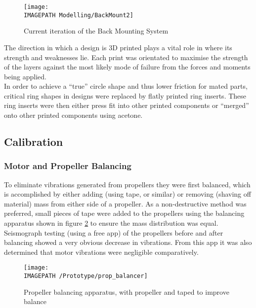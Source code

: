 \begin{figure}[!ht]
	\centering
	\texttt{[image: \\IMAGEPATH Modelling/BackMount2]}
	\caption{Current iteration of the Back Mounting System}
	\label{fig:designbackmount}
\end{figure}
		
The direction in which a design is 3D printed plays a vital role in where its strength and weaknesses lie. Each print was orientated to maximise the strength of the layers against the most likely mode of failure from the forces and moments being applied.\\
In order to achieve a ``true'' circle shape and thus lower friction for mated parts, critical ring shapes in designs were replaced by flatly printed ring inserts. These ring inserts were then either press fit into other printed components or ``merged'' onto other printed components using acetone. 


\subsection{Calibration}
\subsubsection*{Motor and Propeller Balancing}
To eliminate vibrations generated from propellers they were first balanced, which is accomplished by either adding (using tape, or similar) or removing (shaving off material) mass from either side of a propeller. As a non-destructive method was preferred, small pieces of tape were added to the propellers using the balancing apparatus shown in figure \ref{fig:propbalancing} to ensure the mass distribution was equal.  Seismograph testing (using a free app) of the propellers before and after balancing showed a very obvious decrease in vibrations. From this app it was also determined that motor vibrations were negligible comparatively.
\begin{figure}[!ht]
	\centering
	\texttt{[image: \\IMAGEPATH /Prototype/prop\_balancer]}
	\caption{Propeller balancing apparatus, with propeller and taped to improve balance}
	\label{fig:propbalancing}
\end{figure}

